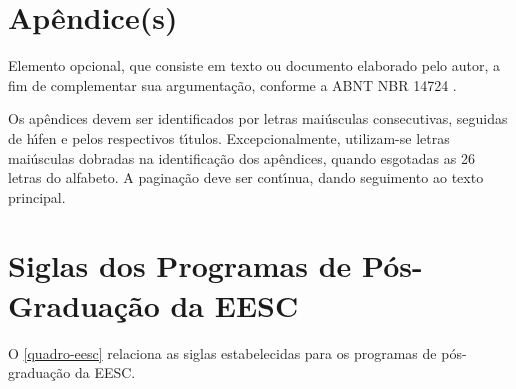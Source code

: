 
\begin{apendicesenv}
\partapendices
\chapter{Ap\^endice(s)}
Elemento opcional, que consiste em texto ou documento elaborado pelo autor, a fim de complementar sua argumenta\c{c}\~ao, conforme a ABNT NBR 14724 \cite{nbr14724}.

Os ap\^endices devem ser identificados por letras mai\'usculas consecutivas, seguidas de h\'{\i}fen e pelos respectivos t\'{\i}tulos. Excepcionalmente, utilizam-se letras mai\'usculas dobradas na identifica\c{c}\~ao dos ap\^endices, quando esgotadas as 26 letras do alfabeto. A pagina\c{c}\~ao deve ser cont\'{\i}nua, dando seguimento ao texto principal. \cite{sibi2009}

\chapter{Siglas dos Programas de P\'os-Gradua\c{c}\~ao da EESC}
O \autoref{quadro-eesc} relaciona as siglas estabelecidas para os programas de p\'os-gradua\c{c}\~ao da EESC.


\end{apendicesenv}
